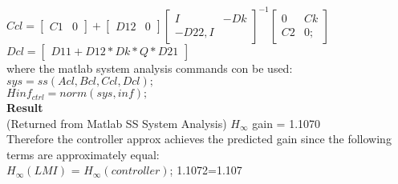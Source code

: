 \documentclass[10pt,a4paper]{article}
\begin{document}
\begin{tcolorbox}
$Ccl =\begin{bmatrix}
C1& 0\end{bmatrix}+\begin{bmatrix}
D12& 0
\end{bmatrix}\begin{bmatrix}
I& -Dk\\-D22, I
\end{bmatrix}^{-1} \begin{bmatrix}
0& Ck\\ C2&0;
\end{bmatrix}$\\

$Dcl = \begin{bmatrix}
D11+D12*Dk*Q*D21
\end{bmatrix} $\\

where the matlab system analysis commands con be used:\\
$sys = ss(Acl, Bcl, Ccl, Dcl);$\\
$Hinf_{ctrl} = norm(sys,inf);$\\
\textbf{Result}\\
(Returned from Matlab SS System Analysis) $H_\infty$ gain = 1.1070\\

Therefore the controller approx achieves the predicted gain since the following terms are approximately equal:\\
   $H_\infty(LMI)$ = $H_\infty(controller)$; 1.1072=1.107
   
\end{tcolorbox}
\end{document}
